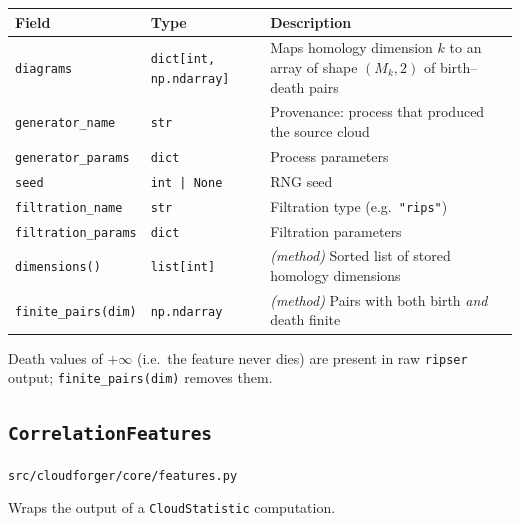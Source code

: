 \documentclass[11pt, a4paper]{article}
\newcommand{\code}[1]{\texttt{#1}}
\newcommand{\pyfile}[1]{\texttt{\small #1}}
\newcommand{\typename}[1]{\textbf{\texttt{#1}}}
\begin{document}
\begin{center}
\begin{tabular}{lll}
\toprule
\textbf{Field} & \textbf{Type} & \textbf{Description} \\
\midrule
\code{diagrams}           & \code{dict[int, np.ndarray]} & Maps homology dimension $k$ to an array of shape $(M_k, 2)$ of birth--death pairs \\
\code{generator\_name}    & \code{str}                   & Provenance: process that produced the source cloud \\
\code{generator\_params}  & \code{dict}                  & Process parameters \\
\code{seed}               & \code{int | None}            & RNG seed \\
\code{filtration\_name}   & \code{str}                   & Filtration type (e.g.\ \code{"rips"}) \\
\code{filtration\_params} & \code{dict}                  & Filtration parameters \\
\midrule
\code{dimensions()} & \code{list[int]} & \emph{(method)} Sorted list of stored homology dimensions \\
\code{finite\_pairs(dim)} & \code{np.ndarray} & \emph{(method)} Pairs with both birth \emph{and} death finite \\
\bottomrule
\end{tabular}
\end{center}

Death values of $+\infty$ (i.e.\ the feature never dies) are present in
raw \code{ripser} output; \code{finite\_pairs(dim)} removes them.

\subsection{\typename{CorrelationFeatures}}
\label{subsec:corrfeatures}
\pyfile{src/cloudforger/core/features.py}

Wraps the output of a \code{CloudStatistic} computation.
\end{document}

